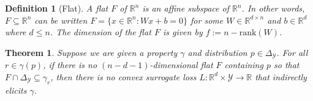 \documentclass{article}
\newcommand{\reals}{\mathbb{R}}
\newcommand{\simplex}{\Delta_\Y}
\newcommand{\Y}{\mathcal{Y}}
\newtheorem{theorem}{Theorem}
\newtheorem{definition}{Definition}
\begin{document}
\begin{definition}[Flat]
	A \emph{flat} $F$ of $\reals^n$ is an affine subspace of $\reals^n$.
	In other words, $F\subseteq \reals^n$ can be written $F=\{x\in\reals^n : Wx + b = 0\}$ for some $W\in\reals^{d\times n}$ and $b\in\reals^d$ where $d\leq n$.
	The dimension of the flat $F$ is given by $f := n - \mathrm{rank}(W)$.
\end{definition}

\begin{theorem}\label{thm:cvx-flats}
	Suppose we are given a property $\gamma$ and distribution $p \in \simplex$.
	For all $r\in\gamma(p)$, if there is no $(n - d-1)$-dimensional flat $F$ containing $p$ so that $F \cap \simplex \subseteq \gamma_r$, then there is no convex surrogate loss $L : \reals^d \times \Y \to \reals$ that indirectly elicits $\gamma$.
\end{theorem}
\end{document}
